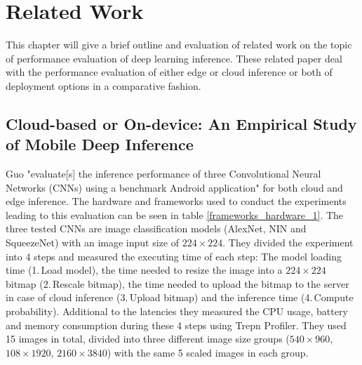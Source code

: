 \chapter{Related Work}
\label{chap:relatedWork}
This chapter will give a brief outline and evaluation of related work on the topic of performance evaluation of deep learning inference. These related paper deal with the performance evaluation of either edge or cloud inference or both of deployment options in a comparative fashion.



\section{Cloud-based or On-device:
An Empirical Study of Mobile Deep Inference}
Guo "evaluate[s] the inference performance of three Convolutional Neural Networks
(CNNs) using a benchmark Android application" \cite{DBLP:conf/ic2e/Guo18} for both cloud and edge inference. The hardware and frameworks used to conduct the experiments leading to this evaluation can be seen in table \ref{frameworks_hardware_1}. The three tested CNNs are image classification models (AlexNet, NIN and SqueezeNet) with an image input size of $224\times224$.
They divided the experiment into 4 steps and measured the executing time of each step: 
The model loading time (1.\,Load model), the time needed to resize the image into a $224\times224$ bitmap (2.\,Rescale bitmap), the time needed to upload the bitmap to the server in case of cloud inference (3.\,Upload bitmap) and the inference time (4.\,Compute probability).
Additional to the latencies they measured the CPU usage, battery and memory consumption during these 4 steps using Trepn Profiler.
They used 15 images in total, divided into three different image size groups ($540\times960$, $108\times1920$, $2160\times3840$) with the same 5 scaled images in each group.

